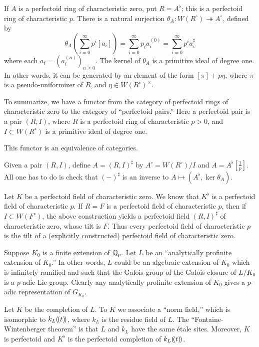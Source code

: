 \documentclass{article}
\begin{document}
If $A$ is a perfectoid ring of characteristic zero, put $R=A^\flat$; this is 
a perfectoid ring of characteristic $p$. There is a natural surjection 
$\theta_A:W(R^\circ) \twoheadrightarrow A^\circ$, defined by 
\[
  \theta_A\left(\sum_{i=0}^\infty p^i [a_i]\right) = \sum_{i=0}^\infty p_i a_i^{(0)} = \sum_{i=0}^\infty p^i a_i^\sharp
\]
where each $a_i=(a_i^{(n)})_{n\geqslant 0}$. The kernel of 
$\theta_A$ is a primitive ideal of degree one. In other words, it can be generated 
by an element of the form $[\pi]+p\eta$, where $\pi$ is a pseudo-uniformizer 
of $R$, and $\eta\in W(R^\circ)^\times$. 

To summarize, we have a functor from the category of perfectoid rings of characteristic 
zero to the category of ``perfectoid pairs.'' Here a perfectoid pair is a pair 
$(R,I)$, where $R$ is a perfectoid ring of characteristic $p>0$, and 
$I\subset W(R^\circ)$ is a primitive ideal of degree one. 

\begin{theorem}
This functor is an equivalence of categories.
\end{theorem}
Given a pair $(R,I)$, define $A=(R,I)^\sharp$ by 
$A^\circ =W(R^\circ)/I$ and $A=A^\flat[\frac 1 p]$. All one has to do is check that 
$(-)^\sharp$ is an inverse to $A\mapsto (A^\flat, \ker\theta_A)$. 






Let $K$ be a perfectoid field of characteristic zero. We know that $K^\flat$ is a 
perfectoid field of characteristic $p$. If $R=F$ is a perfectoid field of 
characteristic $p$, then if $I\subset W(F^\circ)$, the above construction 
yields a perfectoid field $(R,I)^\sharp$ of characteristic zero, whose tilt is 
$F$. Thus every perfectoid field of characteristic $p$ is the tilt of a 
(explicitly constructed) perfectoid field of characteristic zero. 

Suppose $K_0$ is a finite extension of $\mathbb{Q}_p$. Let $L$ be an ``analytically 
profinite extension of $K_0$.'' In other words, $L$ could be an algebraic extension 
of $K_0$ which is infinitely ramified and such that the Galois group of the Galois 
closure of $L/K_0$ is a $p$-adic Lie group. Clearly any analytically profinite 
extension of $K_0$ gives a $p$-adic representation of $G_{K_0}$. 

Let $K$ be the completion of $L$. To $K$ we associate a ``norm field,'' which is 
isomorphic to $k_L(\!( {t} )\!)$, where $k_L$ is the residue field of $L$. The 
``Fontaine-Wintenberger theorem'' is that $L$ and $k_L$ have the same 
\'etale sites. Moreover, $K$ is perfectoid and 
$K^\flat$ is the perfectoid completion of $k_L(\!( {t} )\!)$. 
\end{document}
